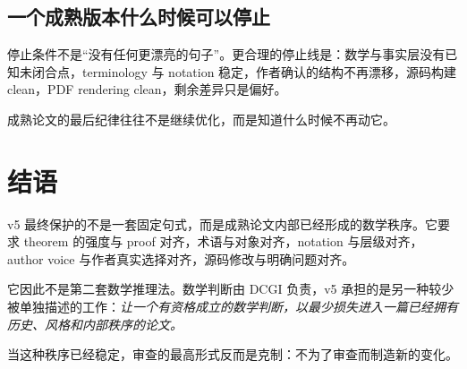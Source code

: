 \documentclass[UTF8,fontset=none,12pt,openany]{ctexbook}
\begin{document}
\section{一个成熟版本什么时候可以停止}

停止条件不是“没有任何更漂亮的句子”。更合理的停止线是：数学与事实层没有已知未闭合点，terminology 与 notation 稳定，作者确认的结构不再漂移，源码构建 clean，PDF rendering clean，剩余差异只是偏好。

成熟论文的最后纪律往往不是继续优化，而是知道什么时候不再动它。

\backmatter
\chapter*{结语}

v5 最终保护的不是一套固定句式，而是成熟论文内部已经形成的数学秩序。它要求 theorem 的强度与 proof 对齐，术语与对象对齐，notation 与层级对齐，author voice 与作者真实选择对齐，源码修改与明确问题对齐。

它因此不是第二套数学推理法。数学判断由 DCGI 负责，v5 承担的是另一种较少被单独描述的工作：\emph{让一个有资格成立的数学判断，以最少损失进入一篇已经拥有历史、风格和内部秩序的论文。}

当这种秩序已经稳定，审查的最高形式反而是克制：不为了审查而制造新的变化。
\end{document}
